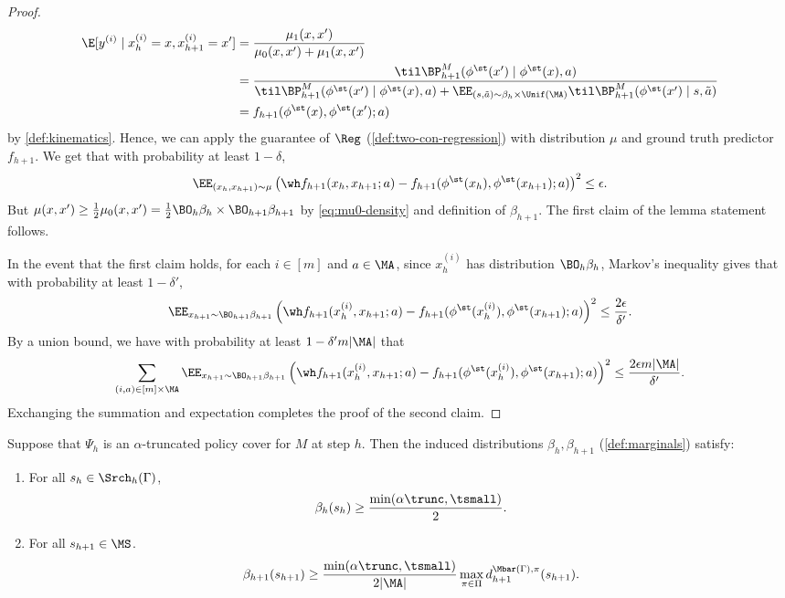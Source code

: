 \begin{proof}
\begin{align*}
\E[y^{(i)}\mid{}x_h^{(i)}=x,x_{h+1}^{(i)}=x']
&= \frac{\mu_1(x,x')}{\mu_0(x,x') + \mu_1(x,x')} \\ 
&= \frac{\til\BP^M_{h+1}(\phi^\st(x')\mid{}\phi^\st(x),a)}{\til\BP^M_{h+1}(\phi^\st(x')\mid{}\phi^\st(x),a) + \EE_{(s,\tilde a)\sim\beta_h\times\Unif(\MA)} \til\BP^M_{h+1}(\phi^\st(x')\mid{}s,\tilde a)} \\ 
&= f_{h+1}(\phi^\st(x),\phi^\st(x');a)
\end{align*}
by \cref{def:kinematics}. Hence, we can apply the guarantee of $\Reg$ (\cref{def:two-con-regression}) with distribution $\mu$ and ground truth predictor $f_{h+1}$. We get that with probability at least $1-\delta$,
\[\EE_{(x_h,x_{h+1}) \sim \mu} \left(\wh f_{h+1}(x_h,x_{h+1};a) - f_{h+1}(\phi^\st(x_h),\phi^\st(x_{h+1});a)\right)^2 \leq \epsilon.\]
But $\mu(x,x') \geq \frac{1}{2}\mu_0(x,x') = \frac{1}{2}\BO_h \beta_h \times \BO_{h+1} \beta_{h+1}$ by \cref{eq:mu0-density} and definition of $\beta_{h+1}$. The first claim of the lemma statement follows.

In the event that the first claim holds, for each $i \in [m]$ and $a \in \MA$, since $x_h^{(i)}$ has distribution $\BO_h\beta_h$, 
Markov's inequality gives that with probability at least $1-\delta'$,
\[\EE_{x_{h+1} \sim \BO_{h+1}\beta_{h+1}}\left(\wh f_{h+1}(x_h^{(i)},x_{h+1};a) - f_{h+1}(\phi^\st(x_h^{(i)}),\phi^\st(x_{h+1});a)\right)^2 \leq \frac{2\epsilon}{\delta'}.\]
By a union bound, we have with probability at least $1-\delta'm|\MA|$ that 
\[\sum_{(i,a)\in[m]\times\MA} \EE_{x_{h+1} \sim \BO_{h+1}\beta_{h+1}}\left(\wh f_{h+1}(x_h^{(i)},x_{h+1};a) - f_{h+1}(\phi^\st(x_h^{(i)}),\phi^\st(x_{h+1});a)\right)^2 \leq \frac{2\epsilon m|\MA|}{\delta'}.\]
Exchanging the summation and expectation completes the proof of the second claim.
\end{proof}

\iffalse
\begin{lemma}\label{lemma:cover-implications}
Suppose that $\Psi_h$ is an $\alpha$-truncated policy cover for $M$ at step $h$. Then the induced distributions $\beta_h,\beta_{h+1}$ (\cref{def:marginals}) satisfy:
\begin{enumerate}
\item For all $s_h \in \Srch_h(\Gamma)$, \[\beta_h(s_h) \geq \frac{\min(\alpha\trunc,\tsmall)}{2}.\]
 \item For all $s_{h+1} \in \MS$.
\[\beta_{h+1}(s_{h+1}) \geq \frac{\min(\alpha\trunc,\tsmall)}{2|\MA|} \max_{\pi\in\Pi} d^{\Mbar(\Gamma),\pi}_{h+1}(s_{h+1}).\]
\end{enumerate}
\end{lemma}

